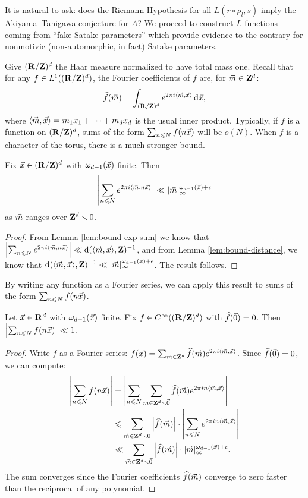 It is natural to ask: does the Riemann Hypothesis for all $L(r\circ \rho_l,s)$ 
imply the Akiyama--Tanigawa conjecture for $A$? We proceed to construct 
$L$-functions coming from ``fake Satake parameters'' which provide evidence to 
the contrary for nonmotivic (non-automorphic, in fact) Satake parameters. 

Give $(\mathbf{R}/\mathbf{Z})^d$ the Haar measure normalized to have total mass one. 
Recall that for any $f\in L^1((\mathbf{R}/\mathbf{Z})^d)$, the Fourier coefficients of $f$ 
are, for $\vec{m}\in \mathbf{Z}^d$: 
\[
	\widehat f(\vec{m}) = \int_{(\mathbf{R}/\mathbf{Z})^d} e^{2\pi i \langle \vec{m},\vec{x}\rangle} \, \mathrm{d} \vec{x} ,
\]
where $\langle \vec{m},\vec{x}\rangle = m_1 x_1 + \cdots + m_d x_d$ is the usual inner 
product. Typically, if $f$ is a function on $(\mathbf{R}/\mathbf{Z})^d$, sums of the form 
$\sum_{n\leqslant N} f(n \vec{x})$ will be $o(N)$. When $f$ is a character of the 
torus, there is a much stronger bound. 

\begin{theorem}
Fix $\vec{x}\in (\mathbf{R}/\mathbf{Z})^d$ with $\omega_{d-1}(\vec{x})$ finite. Then 
\[
	\left| \sum_{n\leqslant N} e^{2\pi i \langle \vec{m}, n \vec{x}\rangle}\right| \ll |\vec{m}|_\infty^{\omega_{d-1}(\vec{x}) + \epsilon} 
\]
as $\vec{m}$ ranges over $\mathbf{Z}^d\smallsetminus 0$. 
\end{theorem}
\begin{proof}
From Lemma \ref{lem:bound-exp-sum} we know that 
$\left| \sum_{n\leqslant N} e^{2\pi i \langle \vec{m}, n \vec{x}\rangle}\right| \ll \mathrm{d}(\langle \vec{m}, \vec{x}\rangle,\mathbf{Z})^{-1}$, 
and from Lemma \ref{lem:bound-distance}, we know that 
$\mathrm{d}(\langle \vec{m},\vec{x}\rangle, \mathbf{Z})^{-1} \ll |\vec{m}|_\infty^{\omega_{d-1}(x)+\epsilon}$. 
The result follows. 
\end{proof}

By writing any function as a Fourier series, we can apply this result to sums 
of the form $\sum_{n\leqslant N} f(n \vec{x})$. 

\begin{theorem}\label{thm:translates-bound-sum}
Let $\vec{x}\in \mathbf{R}^d$ with $\omega_{d-1}(\vec{x})$ finite. Fix 
$f\in C^\infty((\mathbf{R}/\mathbf{Z})^d)$ with $\widehat f(\vec{0})=0$. Then 
$\left| \sum_{n\leqslant N} f(n \vec{x})\right| \ll 1$. 
\end{theorem}
\begin{proof}
Write $f$ as a Fourier series:
$f(\vec{x}) = \sum_{\vec{m}\in \mathbf{Z}^d} \widehat f(\vec{m}) e^{2\pi i \langle \vec{m},\vec{x}\rangle}$. 
Since $\widehat f(\vec{0})=0$, we can compute:
\begin{align*}
	\left| \sum_{n\leqslant N} f(n \vec{x})\right| 
		&= \left| \sum_{n\leqslant N} \sum_{\vec{m}\in \mathbf{Z}^d\smallsetminus \vec{0}} \widehat f(\vec{m}) e^{2\pi i n \langle \vec{m},\vec{x}\rangle}\right| \\
		&\leqslant \sum_{\vec{m}\in \mathbf{Z}^d\smallsetminus \vec{0}} \left|\widehat f(\vec{m})\right|\cdot \left| \sum_{n\leqslant N} e^{2\pi i n \langle \vec{m},\vec{x}\rangle}\right| \\
		&\ll \sum_{\vec{m}\in \mathbf{Z}^d\smallsetminus \vec{0}} \left|\widehat f(\vec{m})\right|\cdot |\vec{m}|_\infty^{\omega_{d-1}(\vec{x}) + \epsilon} .
\end{align*}
The sum converges since the Fourier coefficients $\widehat f(\vec{m})$ converge to 
zero faster than the reciprocal of any polynomial. 
\end{proof}

